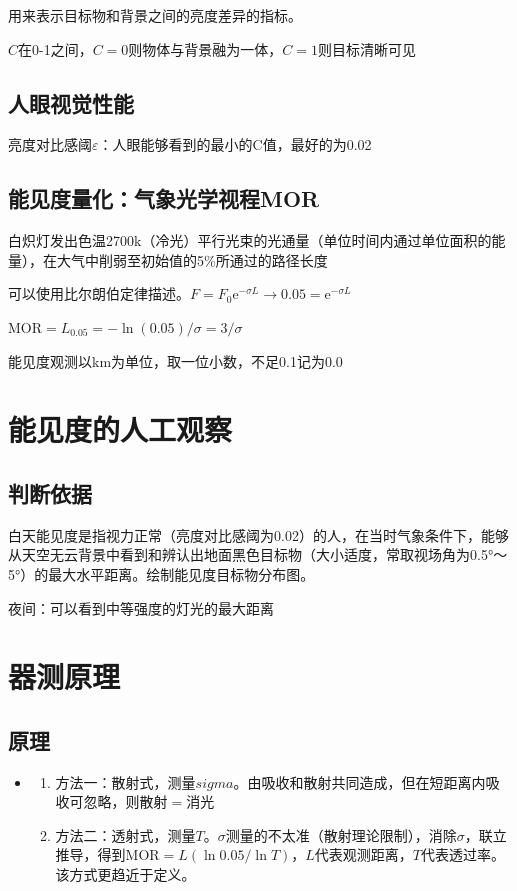 \documentclass[UTF8,11pt]{ctexbook}
\begin{document}
用来表示目标物和背景之间的亮度差异的指标。

\(C\)在0-1之间，\(C=0\)则物体与背景融为一体，\(C=1\)则目标清晰可见

\subsection{人眼视觉性能}

亮度对比感阈\(\varepsilon\)：人眼能够看到的最小的C值，最好的为0.02

\subsection{能见度量化：气象光学视程MOR}

白炽灯发出色温2700k（冷光）平行光束的光通量（单位时间内通过单位面积的能量），在大气中削弱至初始值的5\%所通过的路径长度

可以使用比尔朗伯定律描述。\(F=F_0\mathrm{e}^{-\sigma L}\rightarrow0.05=\mathrm{e}^{-\sigma L}\)

\(\mathrm{MOR}=L_{0.05}=-\ln(0.05)/\sigma=3/\sigma\)

能见度观测以km为单位，取一位小数，不足0.1记为0.0

\section{能见度的人工观察}

\subsection{判断依据}

白天能见度是指视力正常（亮度对比感阈为0.02）的人，在当时气象条件下，能够从天空无云背景中看到和辨认出地面黑色目标物（大小适度，常取视场角为0.5°～5°）的最大水平距离。绘制能见度目标物分布图。

夜间：可以看到中等强度的灯光的最大距离

\section{器测原理}

\subsection{原理}
\begin{itemize}
    \item \begin{enumerate}
        \item 方法一：散射式，测量\(sigma\)。由吸收和散射共同造成，但在短距离内吸收可忽略，则散射\(=\)消光
        \item 方法二：透射式，测量\(T\)。\(\sigma\)测量的不太准（散射理论限制），消除\(\sigma\)，联立推导，得到\(\mathrm{MOR}=L(\ln0.05/\ln T)\)，\(L\)代表观测距离，\(T\)代表透过率。该方式更趋近于定义。
    \end{enumerate}
\end{itemize}
\end{document}
